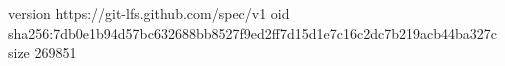 version https://git-lfs.github.com/spec/v1
oid sha256:7db0e1b94d57bc632688bb8527f9ed2ff7d15d1e7c16c2dc7b219acb44ba327c
size 269851
